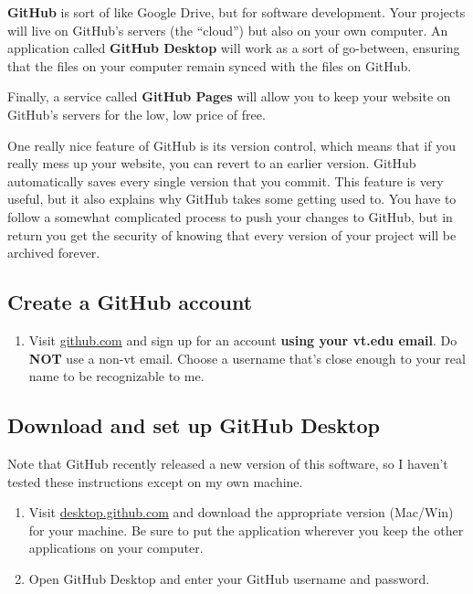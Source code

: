 \documentclass[]{book}
\providecommand{\tightlist}{%
  \setlength{\itemsep}{0pt}\setlength{\parskip}{0pt}}
\theoremstyle{definition}
\theoremstyle{definition}
\theoremstyle{definition}
\theoremstyle{remark}
\begin{document}
\textbf{GitHub} is sort of like Google Drive, but for software
development. Your projects will live on GitHub's servers (the ``cloud'')
but also on your own computer. An application called \textbf{GitHub
Desktop} will work as a sort of go-between, ensuring that the files on
your computer remain synced with the files on GitHub.

Finally, a service called \textbf{GitHub Pages} will allow you to keep
your website on GitHub's servers for the low, low price of free.

One really nice feature of GitHub is its version control, which means
that if you really mess up your website, you can revert to an earlier
version. GitHub automatically saves every single version that you
commit. This feature is very useful, but it also explains why GitHub
takes some getting used to. You have to follow a somewhat complicated
process to push your changes to GitHub, but in return you get the
security of knowing that every version of your project will be archived
forever.

\hypertarget{create-a-github-account}{%
\subsection{Create a GitHub account}\label{create-a-github-account}}

\begin{enumerate}
\def\labelenumi{\arabic{enumi}.}
\tightlist
\item
  Visit \href{https://github.com}{github.com} and sign up for an account
  \textbf{using your vt.edu email}. Do \textbf{NOT} use a non-vt email.
  Choose a username that's close enough to your real name to be
  recognizable to me.
\end{enumerate}

\hypertarget{download-and-set-up-github-desktop}{%
\subsection{Download and set up GitHub
Desktop}\label{download-and-set-up-github-desktop}}

Note that GitHub recently released a new version of this software, so I
haven't tested these instructions except on my own machine.

\begin{enumerate}
\def\labelenumi{\arabic{enumi}.}
\tightlist
\item
  Visit \href{https://desktop.github.com/}{desktop.github.com} and
  download the appropriate version (Mac/Win) for your machine. Be sure
  to put the application wherever you keep the other applications on
  your computer.
\item
  Open GitHub Desktop and enter your GitHub username and password.
\end{enumerate}
\end{document}
